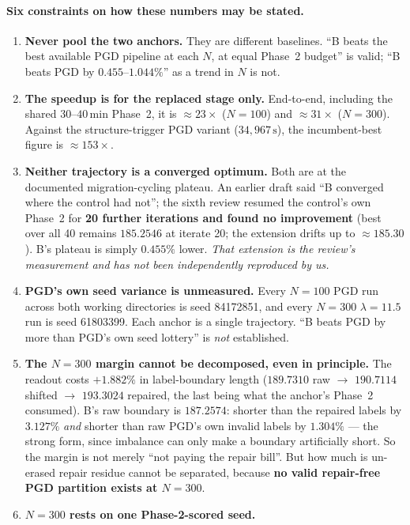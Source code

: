 \documentclass[11pt,a4paper]{article}
\begin{document}
\paragraph{Six constraints on how these numbers may be stated.}
\begin{enumerate}\itemsep2pt
\item \textbf{Never pool the two anchors.} They are different baselines. ``B beats
  the best available PGD pipeline at each \(N\), at equal Phase~2 budget'' is
  valid; ``B beats PGD by \(0.455\text{--}1.044\%\)'' as a trend in \(N\) is not.
\item \textbf{The speedup is for the replaced stage only.} End-to-end, including
  the shared \(30\text{--}40\,\mathrm{min}\) Phase~2, it is \(\approx 23\times\)
  (\(N{=}100\)) and \(\approx 31\times\) (\(N{=}300\)). Against the
  structure-trigger PGD variant (\(34{,}967\,\mathrm{s}\)), the incumbent-best figure is
  \(\approx 153\times\).
\item \textbf{Neither trajectory is a converged optimum.} Both are at the
  documented migration-cycling plateau. An earlier draft said ``B converged where
  the control had not''; the sixth review resumed the control's own Phase~2 for
  \textbf{20 further iterations and found no improvement} (best over all 40 remains
  \(185.2546\) at iterate 20; the extension drifts up to \(\approx 185.30\)). B's
  plateau is simply \(0.455\%\) lower. \emph{That extension is the review's
  measurement and has not been independently reproduced by us.}
\item \textbf{PGD's own seed variance is unmeasured.} Every \(N{=}100\) PGD run
  across both working directories is seed 84172851, and every \(N{=}300\)
  \(\lambda{=}11.5\) run is seed 61803399. Each anchor is a single trajectory.
  ``B beats PGD by more than PGD's own seed lottery'' is \emph{not} established.
\item \textbf{The \(N{=}300\) margin cannot be decomposed, even in principle.} The
  readout costs \(+1.882\%\) in label-boundary length (\(189.7310\) raw \(\to\)
  \(190.7114\) shifted \(\to\) \(193.3024\) repaired, the last being what the
  anchor's Phase~2 consumed). B's raw boundary is \(187.2574\): shorter than the
  repaired labels by \(3.127\%\) \emph{and} shorter than raw PGD's own invalid
  labels by \(1.304\%\) --- the strong form, since imbalance can only make a
  boundary artificially short. So the margin is not merely ``not paying the repair
  bill''. But how much is un-erased repair residue cannot be separated, because
  \textbf{no valid repair-free PGD partition exists at \(N{=}300\)}.
\item \textbf{\(N{=}300\) rests on one Phase-2-scored seed.}
\end{enumerate}
\end{document}
